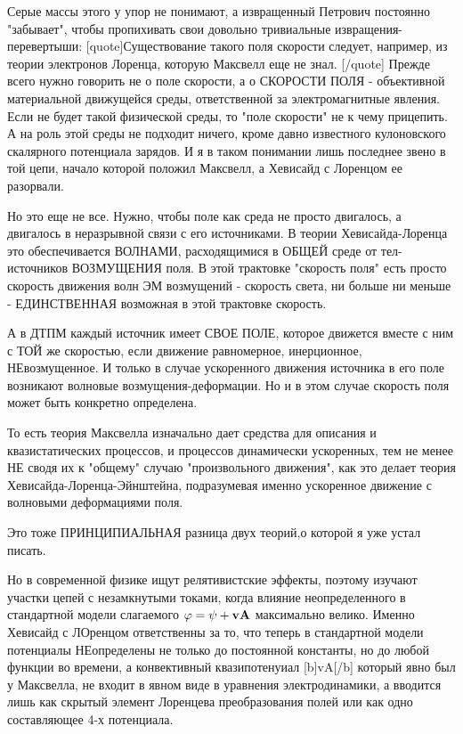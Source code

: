 \documentclass{article}
\begin{document}
Серые массы этого у упор не понимают, а извращенный Петрович постоянно "забывает", чтобы пропихивать свои довольно тривиальные извращения-перевертыши:
[quote]Существование такого поля скорости следует, например, из теории электронов Лоренца, которую Максвелл еще не знал. [/quote]
Прежде всего нужно говорить не о поле скорости, а о СКОРОСТИ ПОЛЯ - объективной материальной движущейся среды, ответственной за электромагнитные явления.
Если не будет такой физической среды, то "поле скорости" не к чему прицепить.
А на роль  этой среды не подходит ничего, кроме давно известного кулоновского скалярного потенциала зарядов.
И я в таком понимании лишь последнее звено в той цепи, начало которой положил Максвелл, а Хевисайд с Лоренцом ее разорвали.

Но это еще не все. Нужно, чтобы поле как среда не просто двигалось, а двигалось в неразрывной связи с его источниками.
В теории Хевисайда-Лоренца это обеспечивается ВОЛНАМИ, расходящимися в ОБЩЕЙ среде от тел-источников ВОЗМУЩЕНИЯ поля. В этой трактовке "скорость поля" есть просто скорость движения волн ЭМ возмущений - скорость света, ни больше ни меньше - ЕДИНСТВЕННАЯ возможная в этой трактовке скорость.

А в ДТПМ каждый источник имеет СВОЕ ПОЛЕ, которое движется вместе с ним  с ТОЙ же скоростью, если движение равномерное, инерционное, НЕвозмущенное.
И только в случае ускоренного движения источника в его поле возникают волновые возмущения-деформации. Но и в этом случае скорость поля может быть конкретно определена.

То есть теория Максвелла изначально дает средства для описания и квазистатических процессов, и процессов динамически ускоренных, тем не менее НЕ сводя их к "общему" случаю "произвольного движения", как это делает теория Хевисайда-Лоренца-Эйнштейна, подразумевая именно ускоренное движение с волновыми деформациями поля.

Это тоже ПРИНЦИПИАЛЬНАЯ разница двух теорий,о которой я уже устал писать.

Но в современной физике ищут релятивистские эффекты, поэтому изучают участки цепей с незамкнутыми токами, когда влияние неопределенного в стандартной модели слагаемого $\varphi=\psi+\bf v\bf A$ максимально велико. %
Именно Хевисайд с ЛОренцом ответственны за то, что теперь в стандартной модели потенциалы НЕопределены не только до постоянной константы, но до любой функции во времени, а конвективный квазипотенуиал [b]vA[/b] который явно был у Максвелла, не входит в явном виде в уравнения электродинамики, а вводится лишь как скрытый элемент Лоренцева преобразования полей или как одно составляющее 4-х потенциала. 
\end{document}
